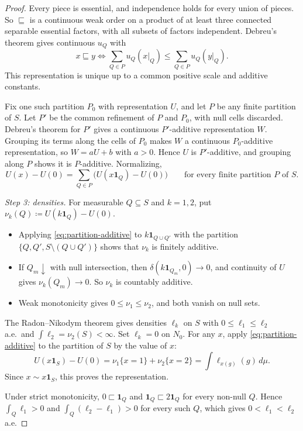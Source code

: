 \documentclass[11pt]{article}
\theoremstyle{remark}\newtheorem{remark}[theorem]{Remark}
\newcommand{\one}{\mathbf 1}
\begin{document}
\begin{proof}
Every piece is essential, and independence holds for every union of pieces.
So $\sqsubseteq$ is a continuous weak order on a product of at least three
connected separable essential factors, with all subsets of factors
independent. Debreu's theorem \cite{Debreu,Wakker} gives continuous
$u_Q$ with
\[
 x\sqsubseteq y\iff\sum_{Q\in P}u_Q(x|_Q)\le\sum_{Q\in P}u_Q(y|_Q).
\]
This representation is unique up to a common positive scale and additive
constants.

Fix one such partition $P_0$ with representation $U$, and let $P$ be any finite
partition of $S$. Let $P'$ be the common refinement of $P$ and $P_0$, with
null cells discarded. Debreu's theorem for $P'$ gives a continuous
$P'$-additive representation $W$. Grouping its terms along the cells of $P_0$
makes $W$ a continuous $P_0$-additive representation, so $W=aU+b$ with $a>0$.
Hence $U$ is $P'$-additive, and grouping along $P$ shows it is $P$-additive.
Normalizing,
\begin{equation}
 U(x)-U(0)=\sum_{Q\in P}\bigl(U(x\one_Q)-U(0)\bigr)
 \qquad\text{for every finite partition }P\text{ of }S.
 \label{eq:partition-additive}
\end{equation}

\emph{Step 3: densities.} For measurable $Q\subseteq S$ and $k=1,2$, put
$\nu_k(Q)\coloneqq U(k\one_Q)-U(0)$.
\begin{itemize}[leftmargin=*,itemsep=2pt]
\item Applying \eqref{eq:partition-additive} to $k\one_{Q\cup Q'}$ with the
partition $\{Q,Q',S\setminus(Q\cup Q')\}$ shows that $\nu_k$ is finitely
additive.
\item If $Q_m\downarrow$ with null intersection, then
$\delta(k\one_{Q_m},0)\to0$, and continuity of $U$ gives $\nu_k(Q_m)\to0$.
So $\nu_k$ is countably additive.
\item Weak monotonicity gives $0\le\nu_1\le\nu_2$, and both vanish on null sets.
\end{itemize}
The Radon--Nikodym theorem gives densities $\ell_k$ on $S$ with
$0\le\ell_1\le\ell_2$ a.e.\ and $\int\ell_2=\nu_2(S)<\infty$. Set $\ell_k=0$ on
$N_0$. For any $x$, apply \eqref{eq:partition-additive} to the partition of
$S$ by the value of $x$:
\[
 U(x\one_S)-U(0)=\nu_1\{x=1\}+\nu_2\{x=2\}=\int\ell_{x(g)}(g)\,d\mu .
\]
Since $x\sim x\one_S$, this proves the representation.

Under strict monotonicity, $0\sqsubset\one_Q$ and $\one_Q\sqsubset2\one_Q$ for
every non-null $Q$. Hence $\int_Q\ell_1>0$ and $\int_Q(\ell_2-\ell_1)>0$ for
every such $Q$, which gives $0<\ell_1<\ell_2$ a.e.
\end{proof}
\end{document}
